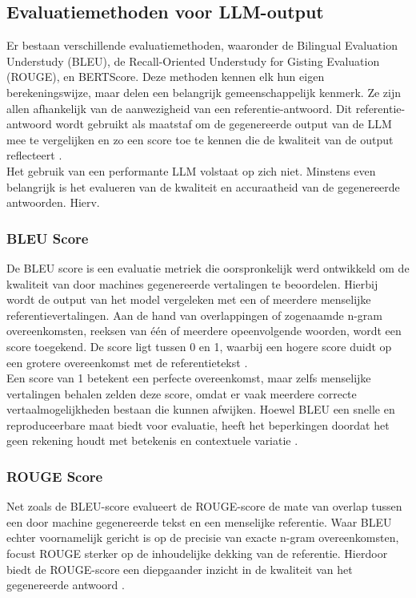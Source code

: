 \subsection{Evaluatiemethoden voor LLM-output}
Er bestaan verschillende evaluatiemethoden, waaronder de Bilingual Evaluation Understudy (BLEU), de Recall-Oriented Understudy for Gisting Evaluation (ROUGE), en BERTScore. Deze methoden kennen elk hun eigen berekeningswijze, maar delen een belangrijk gemeenschappelijk kenmerk. Ze zijn allen afhankelijk van de aanwezigheid van een referentie-antwoord. Dit referentie-antwoord wordt gebruikt als maatstaf om de gegenereerde output van de LLM mee te vergelijken en zo een score toe te kennen die de kwaliteit van de output reflecteert \autocite{microsoft2024evaluation}.
\\[1em]
Het gebruik van een performante LLM volstaat op zich niet. Minstens even belangrijk is het evalueren van de kwaliteit en accuraatheid van de gegenereerde antwoorden. Hierv.

\subsubsection{BLEU Score}

De BLEU score is een evaluatie metriek die oorspronkelijk werd ontwikkeld om de kwaliteit van door machines gegenereerde vertalingen te beoordelen. Hierbij wordt de output van het model vergeleken met een of meerdere menselijke referentievertalingen. Aan de hand van overlappingen of zogenaamde n-gram overeenkomsten, reeksen van één of meerdere opeenvolgende woorden, wordt een score toegekend. De score ligt tussen 0 en 1, waarbij een hogere score duidt op een grotere overeenkomst met de referentietekst \autocite{papineni-etal-2002-bleu}.
\\[1em]
Een score van 1 betekent een perfecte overeenkomst, maar zelfs menselijke vertalingen behalen zelden deze score, omdat er vaak meerdere correcte vertaalmogelijkheden bestaan die kunnen afwijken. Hoewel BLEU een snelle en reproduceerbare maat biedt voor evaluatie, heeft het beperkingen doordat het geen rekening houdt met betekenis en contextuele variatie \autocite{papineni-etal-2002-bleu}.

\subsubsection{ROUGE Score}

Net zoals de BLEU-score evalueert de ROUGE-score de mate van overlap tussen een door machine gegenereerde tekst en een menselijke referentie. Waar BLEU echter voornamelijk gericht is op de precisie van exacte n-gram overeenkomsten, focust ROUGE sterker op de inhoudelijke dekking van de referentie. Hierdoor biedt de ROUGE-score een diepgaander inzicht in de kwaliteit van het gegenereerde antwoord \autocite{ganesan2018rouge20updatedimproved}.

